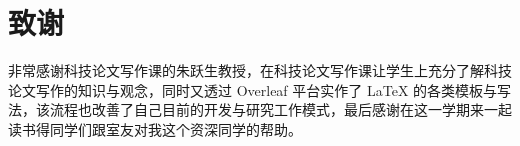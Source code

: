 \chapter{致谢}

非常感谢科技论文写作课的朱跃生教授，在科技论文写作课让学生上充分了解科技论文写作的知识与观念，同时又透过 Overleaf 平台实作了 LaTeX 的各类模板与写法，该流程也改善了自己目前的开发与研究工作模式，最后感谢在这一学期来一起读书得同学们跟室友对我这个资深同学的帮助。
